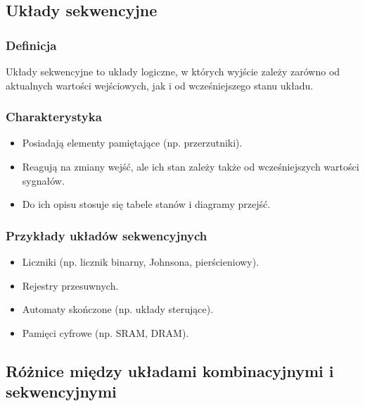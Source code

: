\subsection{Układy sekwencyjne}
\subsubsection{Definicja}
Układy sekwencyjne to układy logiczne, w których wyjście zależy zarówno od aktualnych wartości wejściowych, jak i od wcześniejszego stanu układu.

\subsubsection{Charakterystyka}
\begin{itemize}
    \item Posiadają elementy pamiętające (np. przerzutniki).
    \item Reagują na zmiany wejść, ale ich stan zależy także od wcześniejszych wartości sygnałów.
    \item Do ich opisu stosuje się tabele stanów i diagramy przejść.
\end{itemize}

\subsubsection{Przykłady układów sekwencyjnych}
\begin{itemize}
    \item Liczniki (np. licznik binarny, Johnsona, pierścieniowy).
    \item Rejestry przesuwnych.
    \item Automaty skończone (np. układy sterujące).
    \item Pamięci cyfrowe (np. SRAM, DRAM).
\end{itemize}

\subsection{Różnice między układami kombinacyjnymi i sekwencyjnymi}

